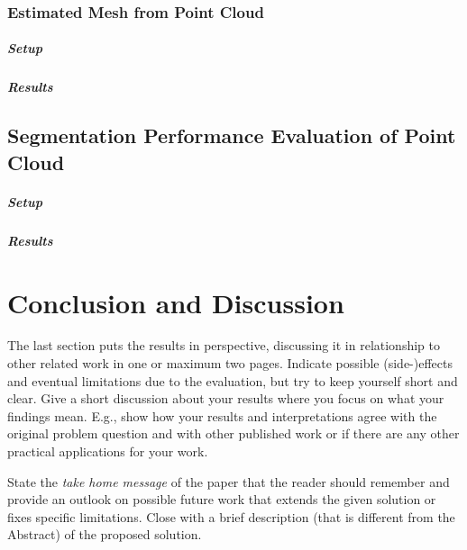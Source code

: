 \documentclass[11pt, a4paper,oneside,chapterprefix=false]{scrbook}
\begin{document}
\subsection{Estimated Mesh from Point Cloud}

\paragraph{Setup}

\paragraph{Results}

\section{Segmentation Performance Evaluation of Point Cloud}

\paragraph{Setup}

\paragraph{Results}


\chapter{Conclusion and Discussion} \label{chp:conclusion}

The last section puts the results in perspective, discussing it in relationship to other related work in one or maximum two pages. Indicate possible (side-)effects and eventual limitations due to the evaluation, but try to keep yourself short and clear. Give a short discussion about your results where you focus on what your findings mean. E.g., show how your results and interpretations agree with the original problem question and with other published work or if there are any other practical applications for your work.

State the \emph{take home message} of the paper that the reader should remember and provide an outlook on possible future work that extends the given solution or fixes specific limitations. Close with a brief description (that is different from the Abstract) of the proposed solution.
\end{document}
